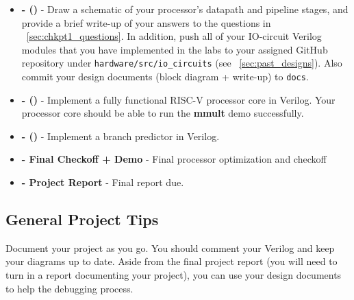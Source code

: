 \documentclass[11pt]{article}
\begin{document}
\begin{minipage}{\textwidth}
\vspace{2mm}
\begin{itemize}

  \item \textbf{\blockDiagramDueDate \space - \blockDiagramTaskName \space (\blockDiagramTimeAlloted)} - Draw a schematic of your processor's datapath and pipeline stages, and provide a brief write-up of your answers to the questions in ~\ref{sec:chkpt1_questions}. In addition, push all of your IO-circuit Verilog modules that you have implemented in the labs to your assigned GitHub repository under \verb|hardware/src/io_circuits| (see ~\ref{sec:past_designs}). Also commit your design documents (block diagram + write-up) to \verb|docs|.
  \item \textbf{\baseCPUDueDate \space - \baseCPUTaskName \space (\baseCPUTimeAlloted)} - Implement a fully functional RISC-V processor core in Verilog. Your processor core should be able to run the \textbf{mmult} demo successfully.

  \item \textbf{\branchPredictorDueDate \space - \branchPredictorTaskName \space (\branchPredictorTimeAlloted)} - Implement a branch predictor in Verilog.
  
  
  \item \textbf{\finalCheckoffDueDate \space - Final Checkoff + Demo} - Final processor optimization and checkoff
  \item \textbf{\finalReportDueDate \space - Project Report} - Final report due.
  
\end{itemize}
\vspace{2mm}
\end{minipage}


\subsection{General Project Tips}
\label{tips}
Document your project as you go.
You should comment your Verilog and keep your diagrams up to date.
Aside from the final project report (you will need to turn in a report documenting your project), you can use your design documents to help the debugging process.
\end{document}
